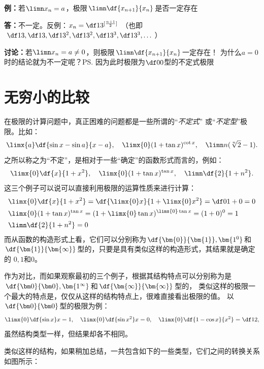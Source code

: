 {\bf 例：}若$\limn x_n=a$，极限$\limn\df{x_{n+1}}{x_n}$是否一定存在

{\bf 答：}不一定。反例：$x_n=\df1{3^{[\frac{n+1}2]}}$ （也即
$\df13, \df13, \df 1{3^2}, \df1{3^2}, \df1{3^3}, \df1{3^3},\ldots$）

{\bf 讨论：}若$\limn x_n=a\ne 0$，则极限$\limn\df{x_{n+1}}{x_n}$一定存在！
为什么$a=0$时的结论就为不一定呢？\ps{因为此时极限为$\df00$型的不定式极限}

\section{无穷小的比较}

在极限的计算问题中，真正困难的问题都是一些所谓的“{\it 不定式}”
或“{\it 不定型}”极限。比如：
$$\limx{a}\df{\sin x-\sin a}{x-a},\quad \limx{0}(1+\tan x)^{\cot x},
\quad \limn n(\sqrt[n]2-1).$$
之所以称之为“不定”，是相对于一些“确定”的函数形式而言的，例如：
$$\limx{0}\df{x}{1+x^2},\quad \limx{0}(1+\tan x)^{\tan x},
\quad \limn\df{2}{1+n^2}.$$
这三个例子可以说可以直接利用极限的运算性质来进行计算：
\begin{align*}
	&\limx{0}\df{x}{1+x^2}=\df{\limx{0} x}{1+\limx{0}x^2}=\df0{1+0}=0\\
	&\limx{0}(1+\tan x)^{\tan x}=(1+\limx{0}\tan x)^{\limx{0}\tan x}
	=(1+0)^0=1\\
	&\limn\df{2}{1+n^2}=0
\end{align*}
而从函数的构造形式上看，它们可以分别称为$\df{\bm{0}}{\bm{1}},\bm{1^0}$和
$\df{\bm{1}}{\bm{\infty}}$型的，只要是具有类似这样的构造形式，其结果就是确定的
$0,1$和$0$。

作为对比，而如果观察最初的三个例子，根据其结构特点可以分别称为是
$\df{\bm0}{\bm0},\bm{1^{\infty}}$和$\df{\bm{\infty}}{\bm{\infty}}$型的，
类似这样的极限一个最大的特点是，仅仅从这样的结构特点上，很难直接看出极限的值。
以$\df{\bm0}{\bm0}$型的极限为例：
$$\limx{0}\df{\sin x}x=1,
\quad \limx{0}\df{\sin x^2}x=0,
\quad \limx{0}\df{1-\cos x}{x^2}=\df12,$$
虽然结构类型一样，但结果却各不相同。

类似这样的结构，如果稍加总结，一共包含如下的一些类型，它们之间的转换关系如图所示：

\begin{center}
\end{center}

